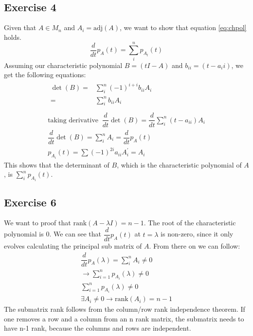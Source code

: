 \subsection{Exercise 4}
Given that $A \in M_n$ and $A_i = \text{adj} (A)$, we want to show that equation \ref{eq:chpol} holds.
\begin{equation}
\label{eq:chpol}
\dfrac{d}{dt} p_A(t) = \sum\limits_i^n p_{A_{t}}(t)
\end{equation}
Assuming our characteristic polynomial $B =( tI - A )$ and $b_{ii} = (t-a_ii)$, we get the following equations:
\begin{gather*}
\begin{array}{cc}
\det (B) =& \sum\limits_i^n (-1)^{i+i} b_{ii} A_i\\
=& \sum\limits_i^n b_{ii} A_{i} \\
\end{array}\\
\text{taking derivative }\
\dfrac{d}{dt} \det (B) = \dfrac{d}{dt} \sum\limits_i^n (t-a_{ii}) A_{i}\\
\dfrac{d}{dt} \det (B) = \sum\limits_i^n A_{i} = \dfrac{d}{dt} p_{A}(t) \\
p_{A_{i}}(t) = \sum\limits (-1)^{2i}  a_{ii} A^{'}_i = A_i
\end{gather*}
This shows that the determinant of $B$, which is the characteristic polynomial of $A$, is $ \sum\limits_i^n p_{A_{i}}(t)$.
\subsection{Exercise 6}
We want to proof that $\text{rank} (A - \lambda I ) = n-1$.
The root of the characteristic polynomial is 0.
We can see that $\dfrac{d}{dt} p_{A}(t)$ at $t = \lambda$ is non-zero, since it only evolves calculating the principal sub matrix of $A$. From there on we can follow:
\begin{gather*}
\dfrac{d}{dt} p_{A}(\lambda) = \sum\limits_i^n A_{i} \neq 0\\
\rightarrow \sum\limits_{i=1}^n p_{A_{i}}(\lambda) \neq 0 \\
\sum\limits_{i=1}^n p_{A_{i}}(\lambda) \neq 0 \\
\exists A_i \neq 0 \rightarrow \text{rank}(A_i) = n-1
\end{gather*}
The submatrix rank follows from the column/row rank independence theorem. If one removes a row and a column from an n rank matrix, the submatrix needs to have n-1 rank, because the columns and rows are independent.

